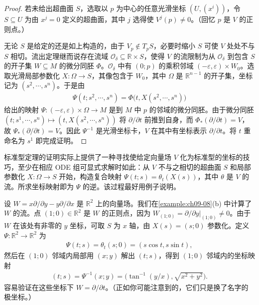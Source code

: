 \documentclass[../../main.tex]{subfiles}
\begin{document}
\begin{proof}
若未给出超曲面 $S$，选取以 $p$ 为中心的任意光滑坐标 $(U,(x^i))$，令 $S\subseteq U$ 为由 $x^j=0$ 定义的超曲面，其中 $j$ 选得使 $V^j(p)\neq 0$。（回忆 $p$ 是 $V$ 的正则点。）

无论 $S$ 是给定的还是如上构造的，由于 $V_p\notin T_pS$，必要时缩小 $S$ 可使 $V$ 处处不与 $S$ 相切。流出定理继而说存在流域 $\mathcal{O}_\delta\subseteq\mathbb{R}\times S$，使得 $V$ 的流限制为从 $\mathcal{O}_\delta$ 到包含 $S$ 的开子集 $W\subseteq M$ 的微分同胚 $\Phi$。$\mathcal{O}_\delta$ 中有 $(0;p)$ 的乘积邻域 $(-\varepsilon,\varepsilon)\times W_0$。选取光滑局部参数化 $X\colon\Omega\to S$，其像包含于 $W_0$，其中 $\Omega$ 是 $\mathbb{R}^{n-1}$ 的开子集，坐标记为 $(s^2,\cdots ,s^n)$。于是由
\begin{align*}
\Psi(t;s^2,\cdots ,s^n)=\Phi\bigl(t,X(s^2,\cdots ,s^n)\bigr)
\end{align*}
给出的映射 $\Psi\colon(-\varepsilon,\varepsilon)\times\Omega\to M$ 是到 $M$ 中 $p$ 的邻域的微分同胚。由于微分同胚 $(t;s^1,\cdots ,s^n)\mapsto(t,X(s^2,\cdots ,s^n))$ 将 $\partial/\partial t$ 前推到自身，而 $\Phi_*(\partial/\partial t)=V$，故 $\Psi_*(\partial/\partial t)=V$。因此 $\Psi^{-1}$ 是光滑坐标卡，$V$ 在其中有坐标表示 $\partial/\partial t$。将 $t$ 重命名为 $s^1$ 即完成证明。
\end{proof}

标准型定理的证明实际上提供了一种寻找使给定向量场 $V$ 化为标准型的坐标的技巧，至少在相应 ODE 组可显式求解时如此：从 $V$ 不与之相切的超曲面 $S$ 和局部参数化 $X\colon\Omega\to S$ 开始，构造复合映射 $\Psi(t;s)=\theta_t(X(s))$，其中 $\theta$ 是 $V$ 的流。所求坐标映射即为 $\Psi$ 的逆。该过程最好用例子说明。

\begin{example}\label{example:ch09-23}
设 $W=x\partial/\partial y-y\partial/\partial x$ 是 $\mathbb{R}^2$ 上的向量场。我们在\cref{example:ch09-08}(b) 中计算了 $W$ 的流。点 $(1;0)\in\mathbb{R}^2$ 是 $W$ 的正则点，因为 $W_{(1;0)}=\partial/\partial y|_{(1;0)}\neq 0$。由于 $W$ 在该处有非零的 $y$ 坐标，可取 $S$ 为 $x$ 轴，由 $X(s)=(s;0)$ 参数化。定义 $\Psi\colon\mathbb{R}^2\to\mathbb{R}^2$ 为
\begin{align*}
\Psi(t;s)=\theta_t(s;0)=(s\cos t,s\sin t),
\end{align*}
然后在 $(1;0)$ 邻域内局部用 $(x;y)$ 解出 $(t;s)$，得到 $(1;0)$ 邻域内的坐标映射
\begin{align}
(t;s)=\Psi^{-1}(x;y)=\bigl(\tan^{-1}(y/x),\sqrt{x^2+y^2}\bigr). \label{align:ch09-13}
\end{align}
容易验证在这些坐标下 $W=\partial/\partial t$。（正如你可能注意到的，它们只是换了名字的极坐标。）
\end{example}
\end{document}
